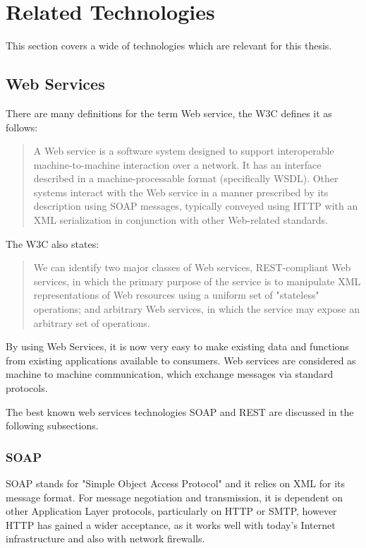 \section{Related Technologies\label{sec:back_rel_tech}}
This section covers a wide of technologies which are relevant for this thesis.	

\subsection{Web Services\label{sec:back_tech_ws}}

There are many definitions for the term Web service, the \ac{W3C} defines it as follows:\cite{W3C}\\
\begin{quote}
A Web service is a software system designed to support interoperable machine-to-machine interaction over a network. It has an interface described in a machine-processable format (specifically \ac{WSDL}). Other systems interact with the Web service in a manner prescribed by its description using \ac{SOAP} messages, typically conveyed using \ac{HTTP} with an \ac{XML} serialization in conjunction with other Web-related standards.
\end{quote}

The \ac{W3C} also states:\cite{W3C} 
\begin{quote}
We can identify two major classes of Web services, \ac{REST}-compliant Web services, in which the primary purpose of the service is to manipulate \ac{XML} representations of Web resources using a uniform set of "stateless" operations; and arbitrary Web services, in which the service may expose an arbitrary set of operations.
\end{quote}

By using Web Services, it is now very easy to make existing data and functions from existing applications available to consumers. Web services are considered as machine to machine communication, which  exchange messages via standard protocols.

The best known web services technologies \ac{SOAP} and \ac{REST} are discussed in the following subsections.

\subsubsection{SOAP\label{sec:back_tech_ws_soap}}
\ac{SOAP} stands for "Simple Object Access Protocol" and it relies on  \ac{XML} for its message format. For message negotiation and transmission, it is dependent on other Application Layer protocols, particularly on \ac{HTTP} or  \ac{SMTP}, however \ac{HTTP} has gained a wider acceptance, as it works well with today's Internet infrastructure and also with network firewalls.

